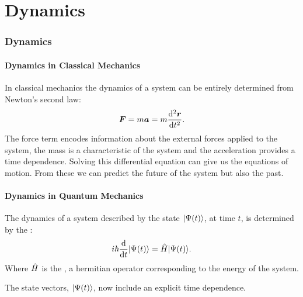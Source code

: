 \part{Dynamics}
    \section{Dynamics}
    \subsection{Dynamics in Classical Mechanics}
    In classical mechanics the dynamics of a system can be entirely determined from Newton's second law:
    \[\bm{F} = m\bm{a} = m\dv[2]{\bm{r}}{t}.\]
    The force term encodes information about the external forces applied to the system, the mass is a characteristic of the system and the acceleration provides a time dependence.
    Solving this differential equation can give us the equations of motion.
    From these we can predict the future of the system but also the past.
    
    \subsection{Dynamics in Quantum Mechanics}
    \begin{postulate}{}{}
        The dynamics of a system described by the state \(\vert {\Psi(t)} \rangle\), at time \(t\), is determined by the :
        \[i\hbar\dv{t}\vert {\Psi(t)} \rangle = \hat{H}\vert {\Psi(t)} \rangle.\]
        Where \(\hat{H}\) is the , a hermitian operator corresponding to the energy of the system.
    \end{postulate}
    The state vectors, \(\vert {\Psi(t)} \rangle\), now include an explicit time dependence.
    

